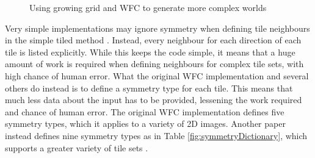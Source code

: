 \begin{figure}[H]
    \centering
    \hfill
    \caption{Using growing grid and WFC to generate more complex worlds \cite{WFC_Neural_Network}}
    \label{fig:growingGrid}
\end{figure}

Very simple implementations may ignore symmetry when defining tile neighbours in the simple tiled method \cite{Easy_WFC}. Instead, every neighbour for each direction of each tile is listed explicitly. While this keeps the code simple, it means that a huge amount of work is required when defining neighbours for complex tile sets, with high chance of human error. What the original WFC implementation and several others do instead is to define a symmetry type for each tile. This means that much less data about the input has to be provided, lessening the work required and chance of human error. The original WFC implementation defines five symmetry types, which it applies to a variety of 2D images. Another paper instead defines nine symmetry types as in Table \ref{fig:symmetryDictionary}, which supports a greater variety of tile sets \cite{WFC_Automatic_Rules_And_Better_Symmetries}.

